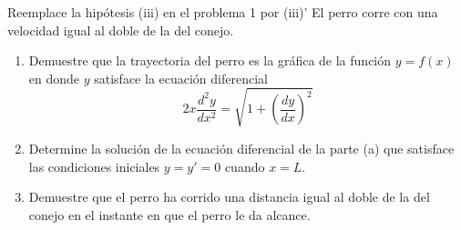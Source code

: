 \item Reemplace la hipótesis (iii) en el problema 1 por 
    (iii)' El perro corre con una velocidad igual al doble de la del conejo.
    \begin{enumerate}
        \item[(a)] Demuestre que la trayectoria del perro es la gráfica de la función $y = f(x)$ en donde $y$ satisface la ecuación diferencial
        \[ 2x \frac{d^2y}{dx^2} = \sqrt{1 + \left(\frac{dy}{dx}\right)^2} \]
        \item[(b)] Determine la solución de la ecuación diferencial de la parte (a) que satisface las condiciones iniciales $y = y' = 0$ cuando $x = L$.
        \item[(c)] Demuestre que el perro ha corrido una distancia igual al doble de la del conejo en el instante en que el perro le da alcance.
    \end{enumerate}
